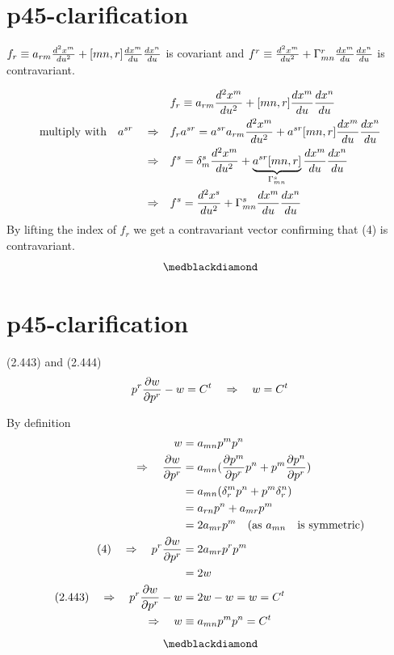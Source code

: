 \section{p45-clarification }
\begin{tcolorbox}
$ f_r \equiv a_{rm}\dv[2]{x^m}{u} +[mn,r]\dv{x^m}{u}\dv{x^n}{u}$ is covariant and 
$ f^r \equiv \dv[2]{x^m}{u} +\Gamma^r_{mn}\dv{x^m}{u}\dv{x^n}{u}$ is contravariant.
\end{tcolorbox}
\begin{align}
\ &f_r \equiv a_{rm}\dv[2]{x^m}{u} +[mn,r]\dv{x^m}{u}\dv{x^n}{u}\\
\text{multiply with}\quad a^{sr}\quad \Rightarrow\quad &f_r a^{sr} = a^{sr}a_{rm}\dv[2]{x^m}{u} +a^{sr}[mn,r]\dv{x^m}{u}\dv{x^n}{u}\\
\Rightarrow\quad &f^{s} = \delta^s_m \dv[2]{x^m}{u} +\underbrace{a^{sr}[mn,r]}_{\Gamma^s_{mn}}\dv{x^m}{u}\dv{x^n}{u}\\
\Rightarrow \quad &f^{s} = \dv[2]{x^s}{u} +\Gamma^s_{mn}\dv{x^m}{u}\dv{x^n}{u}
\end{align}
By lifting the index of $f_r$ we get a contravariant vector confirming that (4) is contravariant.
$$\medblackdiamond$$
\newpage

\section{p45-clarification }
\begin{tcolorbox}
(2.443) and (2.444)
$$ p^r\pdv{w}{p^r} - w = C^t \quad \Rightarrow\quad w = C^t $$ 
\end{tcolorbox}
By definition 
\begin{align}
\ w &= a_{mn}p^mp^n\\
\Rightarrow\quad \pdv{w}{p^r} &= a_{mn}(\pdv{p^m}{p^r}p^n + p^m \pdv{p^n}{p^r})\\
\ &= a_{mn}(\delta^m_rp^n + p^m \delta^n_r)\\
\ &= a_{rn}p^n + a_{mr}p^m \\
\ &= 2a_{mr}p^m \quad\text{(as } a_{mn} \quad \text{is symmetric)}\\
\text{(4)}\quad \Rightarrow \quad p^r\pdv{w}{p^r} &= 2a_{mr}p^rp^m \\
\ &= 2w\\
\text{(2.443)} \quad\Rightarrow\quad p^r\pdv{w}{p^r} -w &= 2w-w = w = C^t\\
\Rightarrow\quad w &\equiv a_{mn}p^mp^n = C^t
\end{align}
$$\medblackdiamond$$
\newpage

